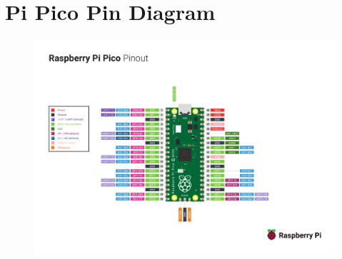 \documentclass[%
 reprint,
 amsmath,amssymb,
 aps,
]{revtex4-2}
\begin{document}
\clearpage


\clearpage
\onecolumngrid
\appendix

\section{Pi Pico Pin Diagram}

    \begin{figure}[h]
        \includegraphics[width=\columnwidth]{Images/Pico-R3-A4-Pinout.pdf}
    \end{figure}
\end{document}
